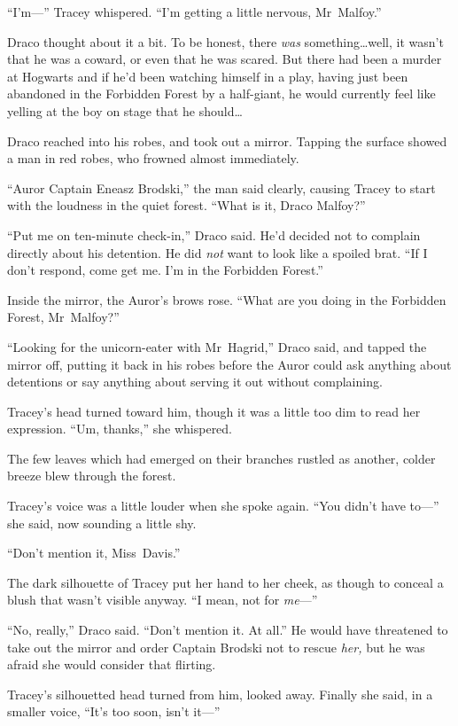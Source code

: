 “I’m—” Tracey whispered. “I’m getting a little nervous, Mr~Malfoy.”

Draco thought about it a bit. To be honest, there \emph{was} something…well, it wasn’t that he was a coward, or even that he was scared. But there had been a murder at Hogwarts and if he’d been watching himself in a play, having just been abandoned in the Forbidden Forest by a half-giant, he would currently feel like yelling at the boy on stage that he should…

Draco reached into his robes, and took out a mirror. Tapping the surface showed a man in red robes, who frowned almost immediately.

“Auror Captain Eneasz Brodski,” the man said clearly, causing Tracey to start with the loudness in the quiet forest. “What is it, Draco Malfoy?”

“Put me on ten-minute check-in,” Draco said. He’d decided not to complain directly about his detention. He did \emph{not} want to look like a spoiled brat. “If I don’t respond, come get me. I’m in the Forbidden Forest.”

Inside the mirror, the Auror’s brows rose. “What are you doing in the Forbidden Forest, Mr~Malfoy?”

“Looking for the unicorn-eater with Mr~Hagrid,” Draco said, and tapped the mirror off, putting it back in his robes before the Auror could ask anything about detentions or say anything about serving it out without complaining.

Tracey’s head turned toward him, though it was a little too dim to read her expression. “Um, thanks,” she whispered.

The few leaves which had emerged on their branches rustled as another, colder breeze blew through the forest.

Tracey’s voice was a little louder when she spoke again. “You didn’t have to—” she said, now sounding a little shy.

“Don’t mention it, Miss~Davis.”

The dark silhouette of Tracey put her hand to her cheek, as though to conceal a blush that wasn’t visible anyway. “I mean, not for \emph{me}—”

“No, really,” Draco said. “Don’t mention it. At all.” He would have threatened to take out the mirror and order Captain Brodski not to rescue \emph{her,} but he was afraid she would consider that flirting.

Tracey’s silhouetted head turned from him, looked away. Finally she said, in a smaller voice, “It’s too soon, isn’t it—”

